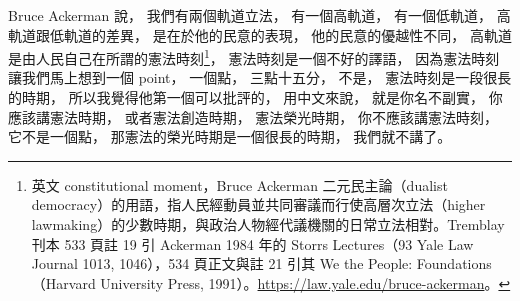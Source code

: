 \hypertarget{w02:cue:2060}{}Bruce Ackerman 說，
\hypertarget{w02:cue:2061}{}我們有兩個軌道立法，
\hypertarget{w02:cue:2062}{}有一個高軌道，
\hypertarget{w02:cue:2063}{}有一個低軌道，
\hypertarget{w02:cue:2064}{}高軌道跟低軌道的差異，
\hypertarget{w02:cue:2065}{}是在於他的民意的表現，
\hypertarget{w02:cue:2066}{}他的民意的優越性不同，
\hypertarget{w02:cue:2067}{}高軌道是由人民自己在所謂的憲法時刻\footnote{英文 constitutional moment，Bruce Ackerman 二元民主論（dualist democracy）的用語，指人民經動員並共同審議而行使高層次立法（higher lawmaking）的少數時期，與政治人物經代議機關的日常立法相對。Tremblay 刊本 533 頁註 19 引 Ackerman 1984 年的 Storrs Lectures（93 Yale Law Journal 1013, 1046），534 頁正文與註 21 引其 We the People: Foundations（Harvard University Press, 1991）。\url{https://law.yale.edu/bruce-ackerman}。}，
\hypertarget{w02:cue:2068}{}憲法時刻是一個不好的譯語，
\hypertarget{w02:cue:2069}{}因為憲法時刻讓我們馬上想到一個 point，
\hypertarget{w02:cue:2070}{}一個點，
\hypertarget{w02:cue:2071}{}三點十五分，
\hypertarget{w02:cue:2072}{}不是，
\hypertarget{w02:cue:2073}{}憲法時刻是一段很長的時期，
\hypertarget{w02:cue:2074}{}所以我覺得他第一個可以批評的，
\hypertarget{w02:cue:2075}{}用中文來說，
\hypertarget{w02:cue:2076}{}就是你名不副實，
\hypertarget{w02:cue:2077}{}你應該講憲法時期，
\hypertarget{w02:cue:2078}{}或者憲法創造時期，
\hypertarget{w02:cue:2079}{}憲法榮光時期，
\hypertarget{w02:cue:2080}{}你不應該講憲法時刻，
\hypertarget{w02:cue:2081}{}它不是一個點，
\hypertarget{w02:cue:2082}{}那憲法的榮光時期是一個很長的時期，
\hypertarget{w02:cue:2083}{}我們就不講了。

